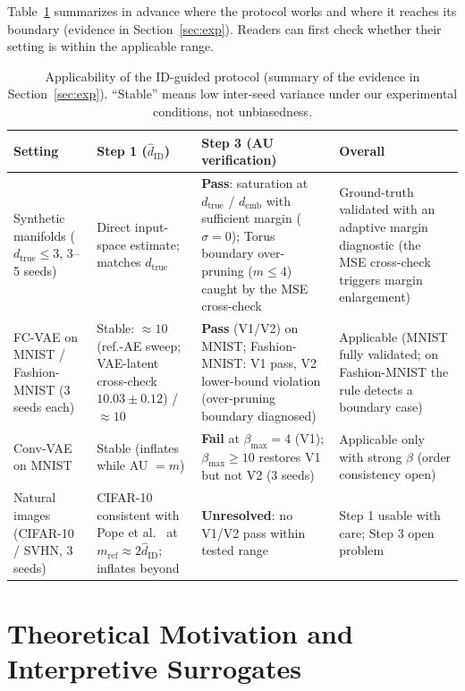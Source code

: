 \documentclass[make,article,submit,pdftex,moreauthors]{Definitions/mdpi}
\newcommand{\hatdID}{\hat{d}_{\mathrm{ID}}}
\newcommand{\dtrue}{d_{\mathrm{true}}}
\newcommand{\demb}{d_{\mathrm{emb}}}
\begin{document}
Table~\ref{tab:applicability} summarizes in advance where the protocol works
and where it reaches its boundary (evidence in Section~\ref{sec:exp}).
Readers can first check whether their setting is within the applicable
range.

\begin{table}[H]
\caption{Applicability of the ID-guided protocol (summary of the evidence in
Section~\ref{sec:exp}). ``Stable'' means low inter-seed variance under our
experimental conditions, not unbiasedness.}
\label{tab:applicability}
\small
\begin{tabular}{p{2.6cm}p{2.9cm}p{3.1cm}p{3.6cm}}
\toprule
\textbf{Setting} & \textbf{Step 1 ($\hatdID$)} & \textbf{Step 3 (AU verification)} & \textbf{Overall} \\
\midrule
Synthetic manifolds ($\dtrue \leq 3$, 3--5 seeds) & Direct input-space estimate; matches $\dtrue$ & \textbf{Pass}: saturation at $\dtrue$ / $\demb$ with sufficient margin ($\sigma = 0$); Torus boundary over-pruning ($m \leq 4$) caught by the MSE cross-check & Ground-truth validated with an adaptive margin diagnostic (the MSE cross-check triggers margin enlargement) \\
\addlinespace
FC-VAE on MNIST / Fashion-MNIST (3 seeds each) & Stable: $\approx 10$ (ref.-AE sweep; VAE-latent cross-check $10.03 \pm 0.12$) / $\approx 10$ & \textbf{Pass} (V1/V2) on MNIST; Fashion-MNIST: V1 pass, V2 lower-bound violation (over-pruning boundary diagnosed) & Applicable (MNIST fully validated; on Fashion-MNIST the rule detects a boundary case) \\
\addlinespace
Conv-VAE on MNIST & Stable (inflates while AU $= m$) & \textbf{Fail} at $\beta_{\max} = 4$ (V1); $\beta_{\max} \geq 10$ restores V1 but not V2 (3 seeds) & Applicable only with strong $\beta$ (order consistency open) \\
\addlinespace
Natural images (CIFAR-10 / SVHN, 3 seeds) & CIFAR-10 consistent with Pope et al.~\cite{pope2021intrinsic} at $m_{\mathrm{ref}} \approx 2\hatdID$; inflates beyond & \textbf{Unresolved}: no V1/V2 pass within tested range & Step 1 usable with care; Step 3 open problem \\
\bottomrule
\end{tabular}
\end{table}

\section{Theoretical Motivation and Interpretive Surrogates}\label{sec:theory}
\end{document}
